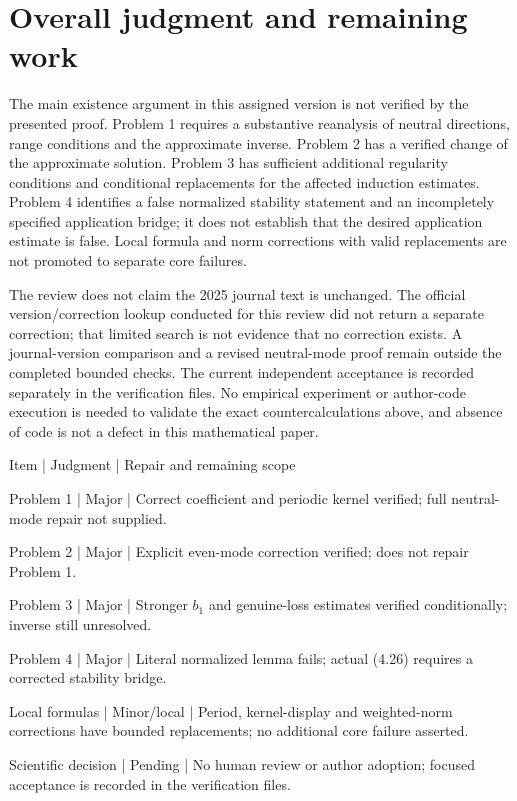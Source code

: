 \documentclass[10pt]{article}
\begin{document}
\section*{Overall judgment and remaining work}
The main existence argument in this assigned version is not verified by the presented proof. Problem 1 requires a substantive reanalysis of neutral directions, range conditions and the approximate inverse. Problem 2 has a verified change of the approximate solution. Problem 3 has sufficient additional regularity conditions and conditional replacements for the affected induction estimates. Problem 4 identifies a false normalized stability statement and an incompletely specified application bridge; it does not establish that the desired application estimate is false. Local formula and norm corrections with valid replacements are not promoted to separate core failures.\par
The review does not claim the 2025 journal text is unchanged. The official version/correction lookup conducted for this review did not return a separate correction; that limited search is not evidence that no correction exists. A journal-version comparison and a revised neutral-mode proof remain outside the completed bounded checks. The current independent acceptance is recorded separately in the verification files. No empirical experiment or author-code execution is needed to validate the exact countercalculations above, and absence of code is not a defect in this mathematical paper.\par
Item | Judgment | Repair and remaining scope\par
Problem 1 | Major | Correct coefficient and periodic kernel verified; full neutral-mode repair not supplied.\par
Problem 2 | Major | Explicit even-mode correction verified; does not repair Problem 1.\par
Problem 3 | Major | Stronger \(b_1\) and genuine-loss estimates verified conditionally; inverse still unresolved.\par
Problem 4 | Major | Literal normalized lemma fails; actual (4.26) requires a corrected stability bridge.\par
Local formulas | Minor/local | Period, kernel-display and weighted-norm corrections have bounded replacements; no additional core failure asserted.\par
Scientific decision | Pending | No human review or author adoption; focused acceptance is recorded in the verification files.\par
\end{document}
